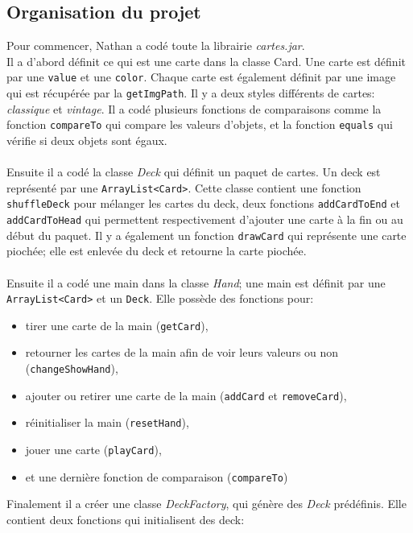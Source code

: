 \documentclass[french,12pt]{article}
\begin{document}
\subsection{Organisation du projet}

Pour commencer, Nathan a codé toute la librairie \textsl{cartes.jar}. \\
Il a d'abord définit ce qui est une carte dans la classe \textsf{Card}. Une carte est définit par une \texttt{value} et une \texttt{color}. Chaque carte est également définit par une image qui est récupérée par la \texttt{getImgPath}. Il y a deux styles différents de cartes: \textit{classique} et \textit{vintage}. Il a codé plusieurs fonctions de comparaisons comme la fonction \texttt{compareTo} qui compare les valeurs d'objets, et la fonction \texttt{equals} qui vérifie si deux objets sont égaux.\\\\
Ensuite il a codé la classe \textsl{Deck} qui définit un paquet de cartes. Un deck est représenté par une \texttt{ArrayList<Card>}. Cette classe contient une fonction \texttt{shuffleDeck} pour mélanger les cartes du deck, deux fonctions \texttt{addCardToEnd} et \texttt{addCardToHead} qui permettent respectivement d'ajouter une carte à la fin ou au début du paquet. Il y a également un fonction \texttt{drawCard} qui représente une carte piochée; elle est enlevée du deck et retourne la carte piochée.\\\\
Ensuite il a codé une main dans la classe \textsl{Hand}; une main est définit par une \texttt{ArrayList<Card>} et un \texttt{Deck}. Elle possède des fonctions pour: 
\begin{itemize}
	\item tirer une carte de la main (\texttt{getCard}), 
	\item retourner les cartes de la main afin de voir leurs valeurs ou non
		  (\texttt{changeShowHand}),
	\item ajouter ou retirer une carte de la main (\texttt{addCard} et
		  \texttt{removeCard}),
	\item réinitialiser la main (\texttt{resetHand}),
	\item jouer une carte (\texttt{playCard}),
	\item et une dernière fonction de comparaison (\texttt{compareTo})\\
\end{itemize}
Finalement il a créer une classe \textsl{DeckFactory}, qui génère des \textsl{Deck} prédéfinis. Elle contient deux fonctions qui initialisent des deck:
\end{document}
